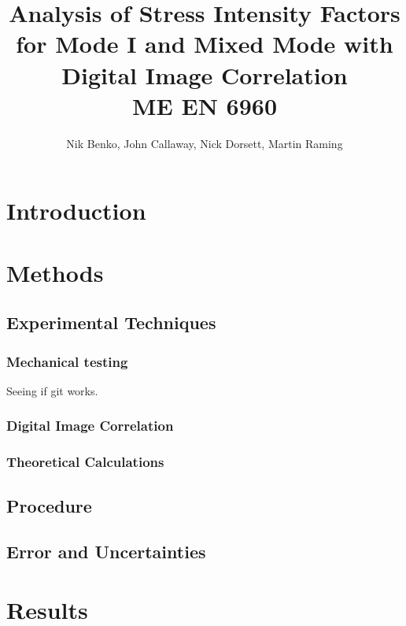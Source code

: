 \documentclass[12pt]{article}
\begin{document}
\title{ Analysis of Stress Intensity Factors for Mode I and Mixed Mode with Digital Image Correlation \\ \normalsize{ME EN 6960}}
\author{Nik Benko, John Callaway, Nick Dorsett, Martin Raming}
\maketitle

\begin{abstract}%
\end{abstract}

\section{Introduction} %

\section{Methods}

\subsection{Experimental Techniques} 
\subsubsection{Mechanical testing} %
Seeing if git works.
\subsubsection{Digital Image Correlation} %
\subsubsection{Theoretical Calculations} %



\subsection{Procedure} %

\subsection{Error and Uncertainties} %

\section{Results}%
\end{document}
